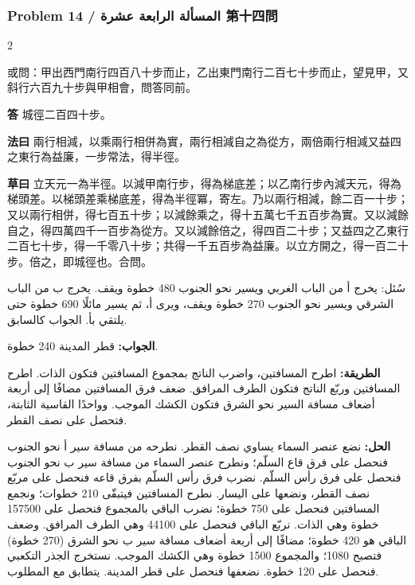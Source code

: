 \documentclass[11pt,a4paper]{article}
\newcommand{\ar}[1]{\arabicfont\beginR #1\endR}
\newcommand{\Answer}[1]{\par\noindent\textbf{\color{problemcolor}答} #1\par}
\newcommand{\Method}[1]{\par\noindent\textbf{\color{problemcolor}法曰} #1\par}
\newcommand{\Workings}[1]{\par\noindent\textbf{\color{problemcolor}草曰} #1\par}
\newcommand{\AnswerAr}{\par\noindent\textbf{\color{problemcolor}\ar{الجواب:}} }
\newcommand{\MethodAr}{\par\noindent\textbf{\color{problemcolor}\ar{الطريقة:}} }
\newcommand{\WorkingsAr}{\par\noindent\textbf{\color{problemcolor}\ar{الحل:}} }
\begin{document}
\vspace{0.5cm}

\subsubsection*{Problem 14 / \ar{المسألة الرابعة عشرة} \quad 第十四問}

\begin{paracol}{2}

\noindent 或問：甲出西門南行四百八十步而止，乙出東門南行二百七十步而止，望見甲，又斜行六百九十步與甲相會，問答同前。

\vspace{0.2cm}

\Answer{城徑二百四十步。}

\vspace{0.2cm}

\Method{兩行相減，以乘兩行相併為實，兩行相減自之為從方，兩倍兩行相減又益四之東行為益廉，一步常法，得半徑。}

\vspace{0.2cm}

\Workings{立天元一為半徑。以減甲南行步，得為梯底差；以乙南行步內減天元，得為梯頭差。以梯頭差乘梯底差，得為半徑冪，寄左。乃以兩行相減，餘二百一十步；又以兩行相併，得七百五十步；以減餘乘之，得十五萬七千五百步為實。又以減餘自之，得四萬四千一百步為從方。又以減餘倍之，得四百二十步；又益四之乙東行二百七十步，得一千零八十步；共得一千五百步為益廉。以立方開之，得一百二十步。倍之，即城徑也。合問。}

\switchcolumn

\ar{سُئل: يخرج أ من الباب الغربي ويسير نحو الجنوب 480 خطوة ويقف. يخرج ب من الباب الشرقي ويسير نحو الجنوب 270 خطوة ويقف، ويرى أ، ثم يسير مائلًا 690 خطوة حتى يلتقي بأ. الجواب كالسابق.}

\vspace{0.2cm}

\AnswerAr{قطر المدينة 240 خطوة.}

\vspace{0.2cm}

\MethodAr{اطرح المسافتين، واضرب الناتج بمجموع المسافتين فتكون الذات. اطرح المسافتين وربّع الناتج فتكون الطرف المرافق. ضعف فرق المسافتين مضافًا إلى أربعة أضعاف مسافة السير نحو الشرق فتكون الكشك الموجب. وواحدًا القاسية الثابتة، فتحصل على نصف القطر.}

\vspace{0.2cm}

\WorkingsAr{نضع عنصر السماء يساوي نصف القطر. نطرحه من مسافة سير أ نحو الجنوب فنحصل على فرق قاع السلّم؛ ونطرح عنصر السماء من مسافة سير ب نحو الجنوب فنحصل على فرق رأس السلّم. نضرب فرق رأس السلّم بفرق قاعه فنحصل على مربّع نصف القطر، ونضعها على اليسار. نطرح المسافتين فيتبقّى 210 خطوات؛ ونجمع المسافتين فنحصل على 750 خطوة؛ نضرب الباقي بالمجموع فنحصل على 157500 خطوة وهي الذات. نربّع الباقي فنحصل على 44100 وهي الطرف المرافق. وضعف الباقي هو 420 خطوة؛ مضافًا إلى أربعة أضعاف مسافة سير ب نحو الشرق (270 خطوة) فتصبح 1080؛ والمجموع 1500 خطوة وهي الكشك الموجب. نستخرج الجذر التكعبي فنحصل على 120 خطوة. نضعفها فنحصل على قطر المدينة. يتطابق مع المطلوب.}

\end{paracol}
\end{document}

